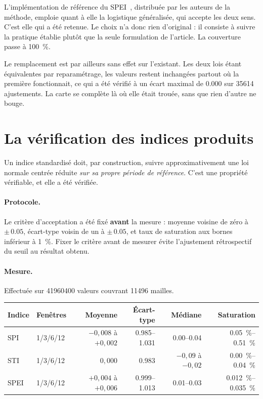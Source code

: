 L'implémentation de référence du SPEI~\cite{begueria_spei_package}, distribuée par les auteurs de
la méthode, emploie quant à elle la logistique généralisée, qui accepte les deux sens. C'est
elle qui a été retenue. Le choix n'a donc rien d'original : il consiste à suivre la pratique
établie plutôt que la seule formulation de l'article. La couverture passe à \SI{100}{\percent}.

Le remplacement est par ailleurs sans effet sur l'existant. Les deux lois étant équivalentes par
reparamétrage, les valeurs restent inchangées partout où la première fonctionnait, ce qui a été
vérifié à un écart maximal de \num{0,000} sur \num{35614} ajustements. La carte se complète là où elle était trouée, sans que rien d'autre ne bouge.

\section{La vérification des indices produits}

Un indice standardisé doit, par construction, suivre approximativement une loi normale centrée
réduite \emph{sur sa propre période de référence}. C'est une propriété vérifiable, et elle a été
vérifiée.

\paragraph{Protocole.} Le critère d'acceptation a été fixé \textbf{avant} la mesure : moyenne
voisine de zéro à $\pm\,\num{0,05}$, écart-type voisin de un à $\pm\,\num{0,05}$, et taux de
saturation aux bornes inférieur à \SI{1}{\percent}. Fixer le critère avant de mesurer évite
l'ajustement rétrospectif du seuil au résultat obtenu.

\paragraph{Mesure.} Effectuée sur \num{41960400} valeurs couvrant \num{11496} mailles.

\begin{center}
\begin{tabularx}{\textwidth}{@{}lXrrrr@{}}
\toprule
\textbf{Indice} & \textbf{Fenêtres} & \textbf{Moyenne} & \textbf{Écart-type} & \textbf{Médiane}
& \textbf{Saturation} \\
\midrule
SPI  & 1/3/6/12 & $-0{,}008$ à $+0{,}002$ & \numrange{0,985}{1,031} & \numrange{0,00}{0,04} & \SIrange{0,05}{0,51}{\percent} \\
STI  & 1/3/6/12 & $0{,}000$               & \num{0,983}            & $-0{,}09$ à $-0{,}02$ & \SIrange{0,00}{0,04}{\percent} \\
SPEI & 1/3/6/12 & $+0{,}004$ à $+0{,}006$ & \numrange{0,999}{1,013} & \numrange{0,01}{0,03} & \SIrange{0,012}{0,035}{\percent} \\
\bottomrule
\end{tabularx}
\end{center}

